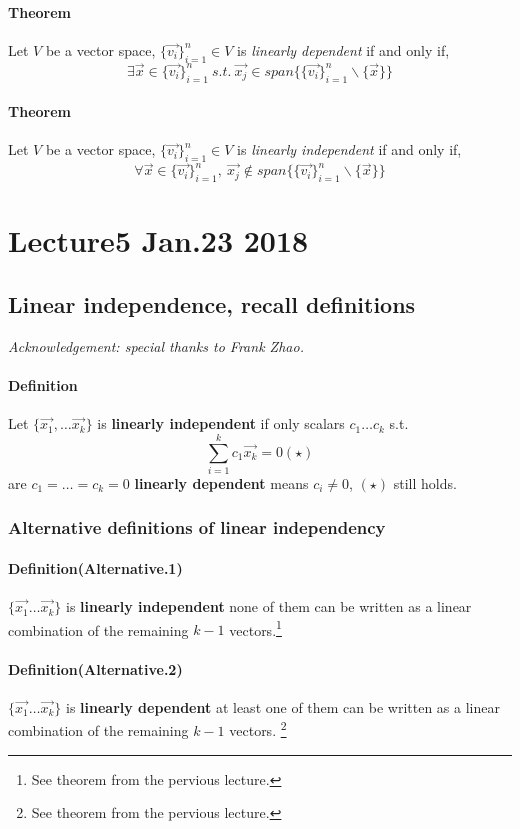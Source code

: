 \documentclass[11pt]{article}
\begin{document}
	\paragraph{Theorem} Let $V$ be a vector space, $\{\vec{v_i}\}_{i=1}^n \in V$ is \emph{linearly dependent} if and only if,
	\[
	\exists \vec{x} \in \{\vec{v_i}\}_{i=1}^n\ s.t.\  \vec{x_j} \in span\{\{\vec{v_i}\}_{i=1}^n \backslash \{\vec{x}\}\}
	\]
	\paragraph{Theorem} Let $V$ be a vector space, $\{\vec{v_i}\}_{i=1}^n \in V$ is \emph{linearly independent} if and only if,
	\[
	\forall \vec{x} \in \{\vec{v_i}\}_{i=1}^n,\ \vec{x_j} \notin span\{\{\vec{v_i}\}_{i=1}^n \backslash \{\vec{x}\}\} 
	\]
	
	\section{Lecture5 Jan.23 2018}
	\subsection{Linear independence, recall definitions}
	\emph{Acknowledgement: special thanks to Frank Zhao.}
	\paragraph{Definition} Let $\{\vec{x_1}, \dots \vec{x_k}\}$ is \textbf{linearly independent} if only scalars $c_1 \dots c_k$ s.t.
		\[
			\sum_{i=1}^k {c_1\vec{x_k}} = 0 (\star)
		\]
		are $c_1 = \dots = c_k = 0$ 
		\newline
		\textbf{linearly dependent} means  $c_i \neq 0$, $(\star)$ still holds.
	\subsubsection{Alternative definitions of linear independency}
	\paragraph{Definition(Alternative.1)} $\{\vec{x_1}\dots\vec{x_k}\}$ is \textbf{linearly independent}  none of them can be written as a linear combination of the remaining $k-1$ vectors.\footnote{See theorem from the pervious lecture.}
	\paragraph{Definition(Alternative.2)} $\{\vec{x_1}\dots\vec{x_k}\}$ is \textbf{linearly dependent}  at least one of them can be written as a linear combination of the remaining $k-1$ vectors. \footnote{See theorem from the pervious lecture.}
	
\end{document}

